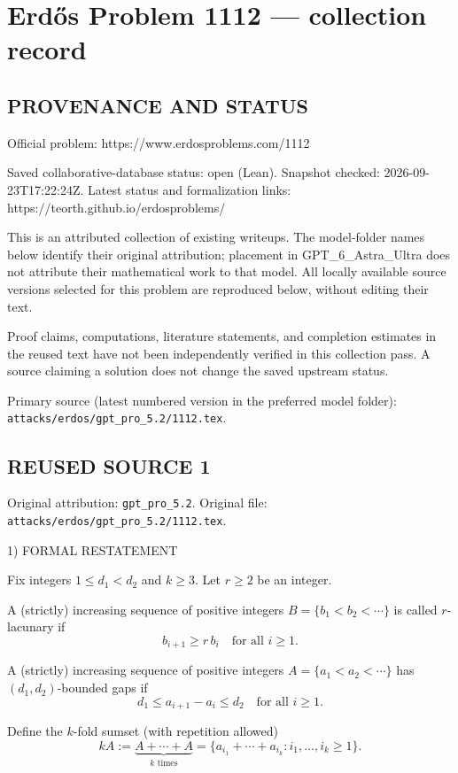 \section*{Erd\H{o}s Problem 1112 --- collection record}

\subsection*{PROVENANCE AND STATUS}
Official problem: https://www.erdosproblems.com/1112

Saved collaborative-database status: open (Lean).
Snapshot checked: 2026-09-23T17:22:24Z.
Latest status and formalization links: https://teorth.github.io/erdosproblems/

This is an attributed collection of existing writeups. The model-folder names below identify their original attribution; placement in GPT\_6\_Astra\_Ultra does not attribute their mathematical work to that model. All locally available source versions selected for this problem are reproduced below, without editing their text.

Proof claims, computations, literature statements, and completion estimates in the reused text have not been independently verified in this collection pass. A source claiming a solution does not change the saved upstream status.

Primary source (latest numbered version in the preferred model folder): \texttt{attacks/erdos/gpt\_pro\_5.2/1112.tex}.

\subsection*{REUSED SOURCE 1}
Original attribution: \texttt{gpt\_pro\_5.2}.
Original file: \texttt{attacks/erdos/gpt\_pro\_5.2/1112.tex}.


1) FORMAL RESTATEMENT

Fix integers \(1\le d_1<d_2\) and \(k\ge 3\).  Let \(r\ge 2\) be an integer.

A (strictly) increasing sequence of positive integers \(B=\{b_1<b_2<\cdots\}\) is called \(r\)-lacunary if
\[
 b_{i+1}\ge r\,b_i\quad\text{for all }i\ge 1.
\]

A (strictly) increasing sequence of positive integers \(A=\{a_1<a_2<\cdots\}\) has \((d_1,d_2)\)-bounded gaps if
\[
 d_1\le a_{i+1}-a_i\le d_2\quad\text{for all }i\ge 1.
\]

Define the \(k\)-fold sumset (with repetition allowed)
\[
 kA := \underbrace{A+\cdots +A}_{k\text{ times}}=\{a_{i_1}+\cdots+a_{i_k}: i_1,\dots,i_k\ge 1\}.
\]

